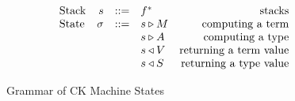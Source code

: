 \documentclass[../main.tex]{subfiles}
\begin{document}
\begin{figure*}
    \centering
    \[\begin{array}{lrclr}
        \textrm{Stack} & s      & ::= & f^*                               & \textrm{stacks}\\
        \textrm{State} & \sigma & ::= & s \triangleright M                  & \textrm{computing a term}\\
                       &        &     & s \triangleright A                  & \textrm{computing a type}\\
                       &        &     & s \triangleleft V                 & \textrm{returning a term value}\\
                       &        &     & s \triangleleft S                 & \textrm{returning a type value}\\
    \end{array}\]
    
    \caption{Grammar of CK Machine States}
    \label{fig:Plutus_core_ck_frames}
\end{figure*}
\end{document}
